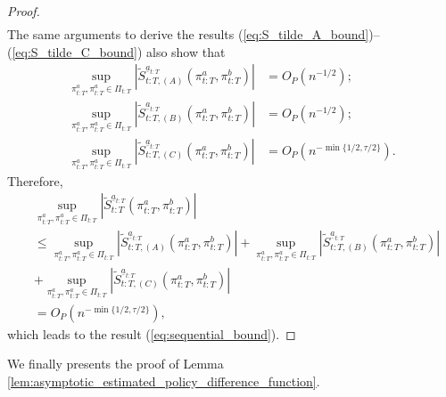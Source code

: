 \begin{proof}
\begin{align*}
\end{align*}
The same arguments to derive the results (\ref{eq:S_tilde_A_bound})--(\ref{eq:S_tilde_C_bound}) also show that
\begin{align*}
    \sup_{\pi_{t:T}^{a},\pi_{t:T}^{a}\in \Pi_{t:T}} \left| \widetilde{S}_{t:T,(A)}^{\underline{a}_{t:T}}(\pi_{t:T}^{a},\pi_{t:T}^{b})\right| &= O_{P}\left(n^{-1/2}\right); \\
    \sup_{\pi_{t:T}^{a},\pi_{t:T}^{a}\in \Pi_{t:T}} \left| \widetilde{S}_{t:T,(B)}^{\underline{a}_{t:T}}(\pi_{t:T}^{a},\pi_{t:T}^{b})\right| &= O_{P}\left(n^{-1/2}\right); \\
    \sup_{\pi_{t:T}^{a},\pi_{t:T}^{a}\in \Pi_{t:T}} \left| \widetilde{S}_{t:T,(C)}^{\underline{a}_{t:T}}(\pi_{t:T}^{a},\pi_{t:T}^{b})\right| &= O_{P}\left(n^{-\min\{1/2,\tau/2\}}\right). 
\end{align*}
Therefore, 
\begin{align*}
    &\sup_{\pi_{t:T}^{a},\pi_{t:T}^{a}\in \Pi_{t:T}} \left| \widetilde{S}_{t:T}^{\underline{a}_{t:T}}(\pi_{t:T}^{a},\pi_{t:T}^{b})\right| \\
    &\leq \sup_{\pi_{t:T}^{a},\pi_{t:T}^{a}\in \Pi_{t:T}} \left| \widetilde{S}_{t:T,(A)}^{\underline{a}_{t:T}}(\pi_{t:T}^{a},\pi_{t:T}^{b})\right| 
    + \sup_{\pi_{t:T}^{a},\pi_{t:T}^{a}\in \Pi_{t:T}} \left| \widetilde{S}_{t:T,(B)}^{\underline{a}_{t:T}}(\pi_{t:T}^{a},\pi_{t:T}^{b})\right| \\
    &+ \sup_{\pi_{t:T}^{a},\pi_{t:T}^{a}\in \Pi_{t:T}} \left| \widetilde{S}_{t:T,(C)}^{\underline{a}_{t:T}}(\pi_{t:T}^{a},\pi_{t:T}^{b})\right| \\
    &= O_{P}\left(n^{-\min\{1/2,\tau/2\}}\right), 
\end{align*}
which leads to the result (\ref{eq:sequential_bound}).
\end{proof}

\medskip

We finally presents the proof of Lemma \ref{lem:asymptotic_estimated_policy_difference_function}.
\bigskip



